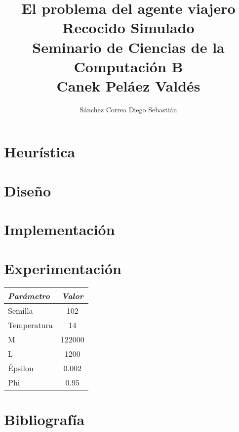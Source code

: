 \documentclass[a4paper]{article}
\title {\textbf {\Large{El problema del agente viajero}}\protect\\
  \large{\textbf{Recocido Simulado}}\protect\\ \vspace{0.4cm}
  \normalsize{\textbf{Seminario de Ciencias de la Computaci\'on B}} \protect\\ \vspace{0.2cm}
  \normalsize{Canek Pel\'aez Vald\'es}}
\date{}
\author{\normalsize Sánchez Correa Diego Sebastián}
\begin{document}
\allowdisplaybreaks
\maketitle

\section{Heur\'istica}
\section{Dise\~no}
\section{Implementaci\'on}
\section{Experimentaci\'on}

\begin{table}[h!]
  \begin{center}
    \begin{tabular}{||l|c||}
      \hline
      \textit{Par\'ametro} & \textit{Valor}\\
      \hline
      Semilla & 102 \\
      Temperatura & 14 \\
      M & 122000 \\
      L & 1200 \\
      \'Epsilon & 0.002 \\
      Phi & 0.95 \\
      \hline
    \end{tabular}
  \end{center}
\end{table}



\begin{figure}[h!tbp]
  \hspace*{-1.6cm}
    
\end{figure}


\begin{figure}[h!tbp]
  \hspace*{-1.6cm}
    
\end{figure}

\section{Bibliograf\'ia}
\end{document}

